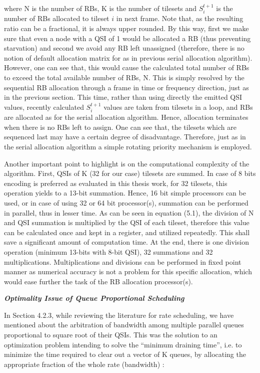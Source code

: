 where N is the number of RBs, K is the number of tilesets and $S_{i}^{t+1}$ is the number of RBs allocated to tileset $i$ in next frame. Note that, as the resulting ratio can be a fractional, it is always upper rounded. By this way, first we make sure that even a node with a QSI of 1 would be allocated a RB (thus preventing starvation) and second we avoid any RB left unassigned (therefore, there is no notion of default allocation matrix for as in previous serial allocation algorithm). However, one can see that, this would cause the calculated total number of RBs to exceed the total available number of RBs, N. This is simply resolved by the sequential RB allocation through a frame in time or frequency direction, just as in the previous section. This time, rather than using directly the emitted QSI values, recently calculated $S_{i}^{t+1}$ values are taken from tilesets in a loop, and RBs are allocated as for the serial allocation algorithm. Hence, allocation terminates when there is no RBs left to assign. One can see that, the tilesets which are sequenced last may have a certain degree of disadvantage. Therefore, just as in the serial allocation algorithm a simple rotating priority mechanism is employed. 

Another important point to highlight is on the computational complexity of the algorithm. First, QSIs of K (32 for our case) tilesets are summed. In case of 8 bits encoding is preferred as evaluated in this thesis work, for 32 tilesets, this operation yields to a 13-bit summation. Hence, 16 bit simple processors can be used, or in case of using 32 or 64 bit processor(s), summation can be performed in parallel, thus in lesser time.  As can be seen in  equation (5.1), the division of N and QSI summation is multiplied by the QSI of each tileset, therefore this value can be calculated once and kept in a register, and utilized repeatedly. This shall save a significant amount of computation time. At the end, there is one division operation (minimum 13-bits with 8-bit QSI), 32 summations and 32 multiplications. Multiplications and divisions can be performed in fixed point manner as numerical accuracy is not a problem for this specific allocation, which would ease further the task of the RB allocation processor(s).

\textbf{\textit{Optimality  Issue of Queue Proportional Scheduling}}

In Section 4.2.3, while reviewing the literature for rate scheduling, we have mentioned about the arbitration of bandwidth among multiple parallel queues proportional to square root of their QSIs. This was the solution to an optimization problem intending to solve the \textquotedblleft minimum draining time\textquotedblright, i.e. to minimize the time required to clear out a vector of K queues, by allocating the appropriate fraction of the whole rate (bandwidth) :

